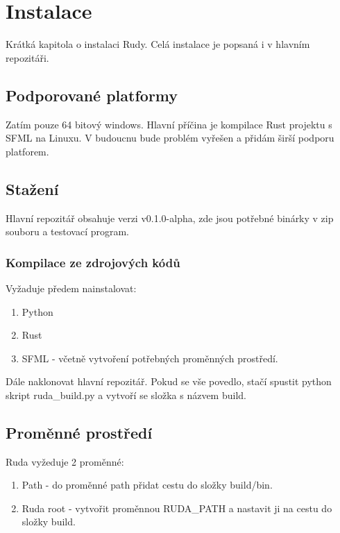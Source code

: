 \documentclass[12pt, a4paper,
twoside,        %
openright
]{report}
\let\oldchapter\chapter
\renewcommand{\chapter}{
	\clearpage
	\pagestyle{fancy}
	\oldchapter
}
\begin{document}
	\chapter{Instalace}
	
	Krátká kapitola o instalaci Rudy. Celá instalace je popsaná i v hlavním repozitáři.
	
	\section{Podporované platformy}
	
	Zatím pouze 64 bitový windows. Hlavní příčina je kompilace Rust projektu s SFML na Linuxu. V budoucnu bude problém vyřešen a přidám širší podporu platforem.
	
	\section{Stažení}
	
	Hlavní repozitář obsahuje verzi v0.1.0-alpha, zde jsou potřebné binárky v zip souboru a testovací program.
	
	\subsection{Kompilace ze zdrojových kódů}
	
	Vyžaduje předem nainstalovat:
	
	\begin{enumerate}
		\item Python
		\item Rust
		\item SFML - včetně vytvoření potřebných proměnných prostředí.
	\end{enumerate}
	
	Dále naklonovat hlavní repozitář. Pokud se vše povedlo, stačí spustit python skript ruda\_build.py a vytvoří se složka s názvem build.
	
	\section{Proměnné prostředí}
	
	Ruda vyžeduje 2 proměnné:
	
	\begin{enumerate}
		\item Path - do proměnné path přidat cestu do složky build/bin.
		\item Ruda root - vytvořit proměnnou RUDA\_PATH a nastavit ji na cestu do složky build.
	\end{enumerate}
	
\end{document}
